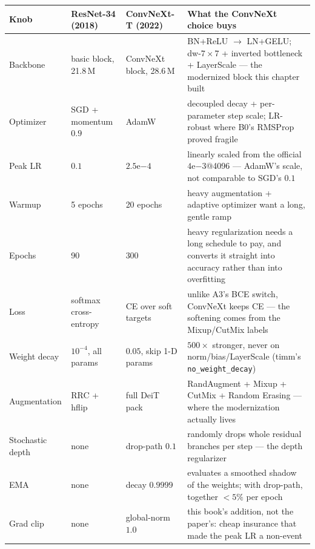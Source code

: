 \begin{center}
\begin{tabular}{@{}l p{2.9cm} p{3.2cm} p{6.3cm}@{}}
\hline
Knob & ResNet-34 (2018) & ConvNeXt-T (2022) & What the ConvNeXt choice buys \\
\hline
Backbone      & basic block, 21.8\,M   & ConvNeXt block, 28.6\,M       & BN+ReLU $\to$ LN+GELU; dw-$7\times7$ + inverted bottleneck + LayerScale --- the modernized block this chapter built \\
Optimizer     & SGD + momentum $0.9$   & AdamW                         & decoupled decay + per-parameter step scale; LR-robust where B0's RMSProp proved fragile \\
Peak LR       & $0.1$                  & $2.5\mathrm{e}{-4}$           & linearly scaled from the official $4\mathrm{e}{-3}$@4096 --- AdamW's scale, not comparable to SGD's $0.1$ \\
Warmup        & 5 epochs               & 20 epochs                     & heavy augmentation + adaptive optimizer want a long, gentle ramp \\
Epochs        & 90                     & 300                           & heavy regularization needs a long schedule to pay, and converts it straight into accuracy rather than into overfitting \\
Loss          & softmax cross-entropy  & CE over soft targets          & unlike A3's BCE switch, ConvNeXt keeps CE --- the softening comes from the Mixup/CutMix labels \\
Weight decay  & $10^{-4}$, all params  & $0.05$, skip 1-D params       & $500\times$ stronger, never on norm/bias/LayerScale (timm's \texttt{no\_weight\_decay}) \\
Augmentation  & RRC + hflip            & full DeiT pack                & RandAugment + Mixup + CutMix + Random Erasing --- where the modernization actually lives \\
Stochastic depth & none                & drop-path $0.1$               & randomly drops whole residual branches per step --- the depth regularizer \\
EMA           & none                   & decay $0.9999$                & evaluates a smoothed shadow of the weights; with drop-path, together ${<}5\%$ per epoch \\
Grad clip     & none                   & global-norm $1.0$             & this book's addition, not the paper's: cheap insurance that made the peak LR a non-event \\
\hline
\end{tabular}
\end{center}


